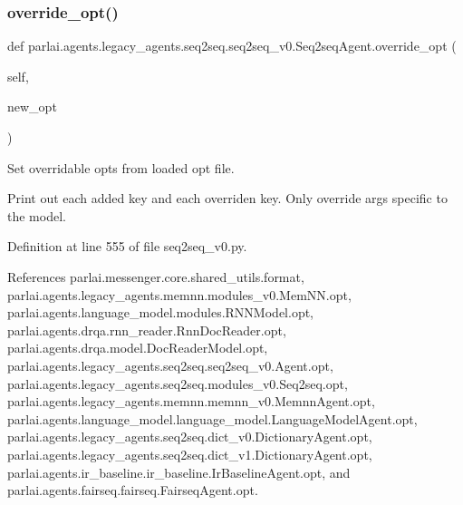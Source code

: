 \subsubsection{\texorpdfstring{override\+\_\+opt()}{override\_opt()}}
{\footnotesize\ttfamily def parlai.\+agents.\+legacy\+\_\+agents.\+seq2seq.\+seq2seq\+\_\+v0.\+Seq2seq\+Agent.\+override\+\_\+opt (\begin{DoxyParamCaption}\item[{}]{self,  }\item[{}]{new\+\_\+opt }\end{DoxyParamCaption})}

\begin{DoxyVerb}Set overridable opts from loaded opt file.

Print out each added key and each overriden key.
Only override args specific to the model.
\end{DoxyVerb}
 

Definition at line 555 of file seq2seq\+\_\+v0.\+py.



References parlai.\+messenger.\+core.\+shared\+\_\+utils.\+format, parlai.\+agents.\+legacy\+\_\+agents.\+memnn.\+modules\+\_\+v0.\+Mem\+N\+N.\+opt, parlai.\+agents.\+language\+\_\+model.\+modules.\+R\+N\+N\+Model.\+opt, parlai.\+agents.\+drqa.\+rnn\+\_\+reader.\+Rnn\+Doc\+Reader.\+opt, parlai.\+agents.\+drqa.\+model.\+Doc\+Reader\+Model.\+opt, parlai.\+agents.\+legacy\+\_\+agents.\+seq2seq.\+seq2seq\+\_\+v0.\+Agent.\+opt, parlai.\+agents.\+legacy\+\_\+agents.\+seq2seq.\+modules\+\_\+v0.\+Seq2seq.\+opt, parlai.\+agents.\+legacy\+\_\+agents.\+memnn.\+memnn\+\_\+v0.\+Memnn\+Agent.\+opt, parlai.\+agents.\+language\+\_\+model.\+language\+\_\+model.\+Language\+Model\+Agent.\+opt, parlai.\+agents.\+legacy\+\_\+agents.\+seq2seq.\+dict\+\_\+v0.\+Dictionary\+Agent.\+opt, parlai.\+agents.\+legacy\+\_\+agents.\+seq2seq.\+dict\+\_\+v1.\+Dictionary\+Agent.\+opt, parlai.\+agents.\+ir\+\_\+baseline.\+ir\+\_\+baseline.\+Ir\+Baseline\+Agent.\+opt, and parlai.\+agents.\+fairseq.\+fairseq.\+Fairseq\+Agent.\+opt.

\mbox{\label{classparlai_1_1agents_1_1legacy__agents_1_1seq2seq_1_1seq2seq__v0_1_1Seq2seqAgent_a073830870e283f88ee45a95c0ae8ad2f}} 
